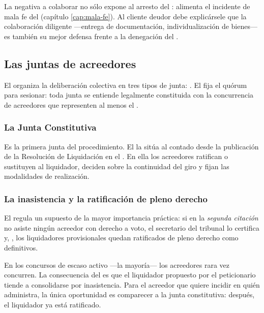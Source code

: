 \begin{practica}
La negativa a colaborar no sólo expone al arresto del : alimenta el incidente de mala
fe del  (capítulo \ref{cap:mala-fe}). Al cliente deudor debe explicársele que la
colaboración diligente ---entrega de documentación, individualización de bienes--- es también su
mejor defensa frente a la denegación del \discharge{}.
\end{practica}

\subsection{Las juntas de acreedores}

El  organiza la deliberación colectiva en tres tipos de junta: . El  fija el quórum para sesionar: toda junta se entiende
legalmente constituida con la concurrencia de acreedores que representen al menos el
.

\subsubsection{La Junta Constitutiva}

Es la primera junta del procedimiento. El  la sitúa al 
contado desde la publicación de la Resolución de Liquidación en el \boletin{}. En ella los
acreedores ratifican o sustituyen al liquidador, deciden sobre la continuidad del giro y fijan
las modalidades de realización.

\subsubsection{La inasistencia y la ratificación de pleno derecho}

El  regula un supuesto de la mayor importancia práctica: si en la \emph{segunda
citación} no asiste ningún acreedor con derecho a voto, el secretario del tribunal lo certifica
y, , los liquidadores provisionales quedan
ratificados de pleno derecho como definitivos.

\begin{foco}
En los concursos de escaso activo ---la mayoría--- los acreedores rara vez concurren. La
consecuencia del  es que el liquidador propuesto por el peticionario tiende a
consolidarse por inasistencia. Para el acreedor que quiere incidir en quién administra, la única
oportunidad es comparecer a la junta constitutiva: después, el liquidador ya está ratificado.
\end{foco}

